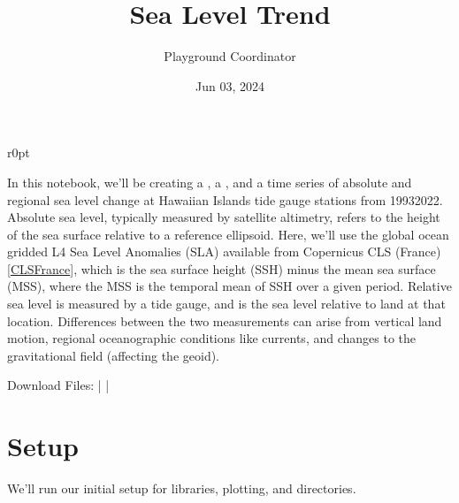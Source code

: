 \documentclass[letterpaper,10pt,english]{jupyterBook}
\title{Sea Level Trend}
\date{Jun 03, 2024}
\author{Playground Coordinator}
\begin{document}
\pagestyle{empty}
\sphinxmaketitle
\pagestyle{plain}
\sphinxtableofcontents
\pagestyle{normal}
\label{\detokenize{notebooks/regional_and_local/SL_Trend::doc}}



\begin{wrapfigure}{r}{0pt}
\centering
\noindent{}
\end{wrapfigure}

\sphinxAtStartPar
In this notebook, we’ll be creating a {\hyperref[\detokenize{notebooks/regional_and_local/SL_Trend:create-a-table}]{}}, a {\hyperref[\detokenize{notebooks/regional_and_local/SL_Trend:fig-mag}]{}}, and a time series {\hyperref[\detokenize{notebooks/regional_and_local/SL_Trend:trend-fig}]{}} of absolute and regional sea level change at Hawaiian Islands tide gauge stations from 1993\sphinxhyphen{}2022. Absolute sea level, typically measured by satellite altimetry, refers to the height of the sea surface relative to a reference ellipsoid. Here, we’ll use the global ocean gridded L4 Sea Level Anomalies (SLA) available from Copernicus CLS (France) {[}\hyperlink{cite.notebooks/regional_and_local/SL_Trend:id10}{CLSFrance}{]}, which is the sea surface height (SSH) minus the mean sea surface (MSS), where the MSS is the temporal mean of SSH over a given period. Relative sea level is measured by a tide gauge, and is the sea level relative to land at that location. Differences between the two measurements can arise from vertical land motion, regional oceanographic conditions like currents, and changes to the gravitational field (affecting the geoid).

\sphinxAtStartPar
Download Files:
 |
 |


\part{Setup}
\label{\detokenize{notebooks/regional_and_local/SL_Trend:setup}}
\sphinxAtStartPar
We’ll run our initial setup for libraries, plotting, and directories.
\end{document}
